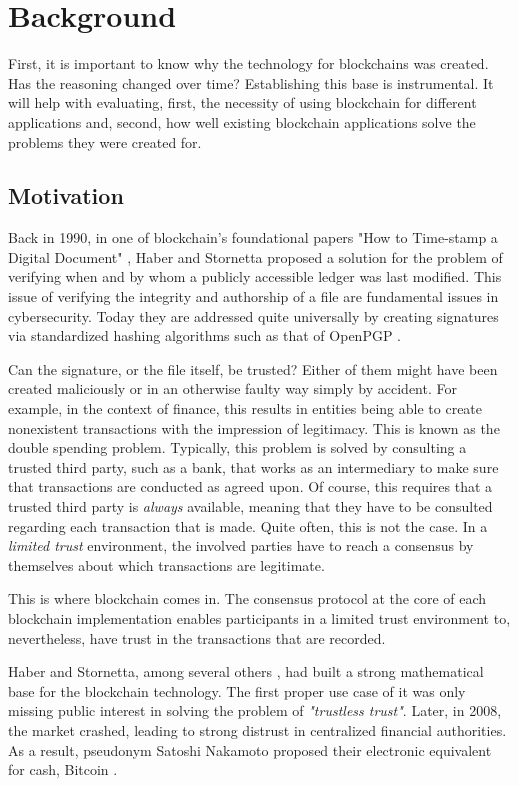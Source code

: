 \section{Background}
First, it is important to know why the technology for blockchains was
created. Has the reasoning changed over time? Establishing this base
is instrumental. It will help with evaluating, first, the necessity of
using blockchain for different applications and, second, how well
existing blockchain applications solve the problems they were created
for.

\subsection{Motivation}
Back in 1990, in one of blockchain's foundational papers "How to
Time-stamp a Digital Document" \cite{haber1990time}, Haber and
Stornetta proposed a solution for the problem of verifying when and by
whom a publicly accessible ledger was last modified. This issue of
verifying the integrity and authorship of a file are fundamental
issues in cybersecurity. Today they are addressed quite universally by
creating signatures via standardized hashing algorithms such as that
of OpenPGP \cite{PGPstandard}. 

Can the signature, or the file itself, be trusted? Either of them
might have been created maliciously or in an otherwise faulty way
simply by accident. For example, in the context of finance, this
results in entities being able to create nonexistent transactions with
the impression of legitimacy. This is known as the double spending
problem. Typically, this problem is solved by consulting a trusted
third party, such as a bank, that works as an intermediary to make
sure that transactions are conducted as agreed upon. Of course, this
requires that a trusted third party is \textit{always} available,
meaning that they have to be consulted regarding each transaction that
is made. Quite often, this is not the case. In a \textit{limited
trust} environment, the involved parties have to reach a consensus by
themselves about which transactions are legitimate.

This is where blockchain comes in. The consensus protocol at the core
of each blockchain implementation enables participants in a limited trust
environment to, nevertheless, have trust in the transactions that are
recorded.

Haber and Stornetta, among several others \cite{haber1990time,
parliamentLamport, benalohBroadcast}, had built a strong mathematical
base for the blockchain technology. The first proper use case of it
was only missing public interest in solving the problem of
\textit{"trustless trust"}. Later, in 2008, the market crashed,
leading to strong distrust in centralized financial authorities. As a
result, pseudonym Satoshi Nakamoto proposed their electronic
equivalent for cash, Bitcoin \cite{nakamoto2008bitcoin}.

